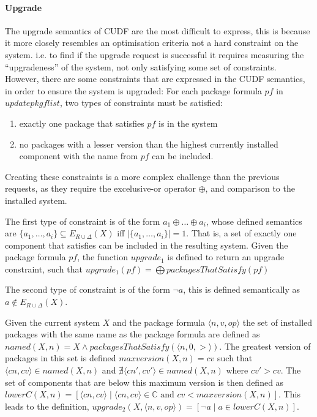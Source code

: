 \paragraph{Upgrade}
The upgrade semantics of CUDF are the most difficult to express, this is because it more closely resembles an optimisation criteria not a hard constraint on the system.
i.e. to find if the upgrade request is successful it requires measuring the ``upgradeness'' of the system, not only satisfying some set of constraints.
However, there are some constraints that are expressed in the CUDF semantics, in order to ensure the system is upgraded:
For each package formula $pf$ in $updatepkgflist$, two types of constraints must be satisfied:
\begin{enumerate}
  \item exactly one package that satisfies $pf$ is in the system
  \item no packages with a lesser version than the highest currently installed component with the name from $pf$ can be included.
\end{enumerate} 

Creating these constraints is a more complex challenge than the previous requests, as they require the excelusive-or operator $\oplus$, and comparison to the installed system. 

The first type of constraint is of the form $a_1 \oplus \ldots \oplus a_i$, 
whose defined semantics are $\{a_1,\ldots,a_i\} \subseteq E_{R \cup \Delta}(X)$ iff $|\{a_1,\ldots,a_i\}| = 1$.
That is, a set of exactly one component that satisfies can be included in the resulting system.
Given the package formula $pf$, the function $upgrade_1$ is defined to return an upgrade constraint,
such that $upgrade_1(pf) = \bigoplus packagesThatSatisfy(pf)$

The second type of constraint is of the form $\neg a$,
this is defined semantically as $a \not \in E_{R \cup \Delta}(X)$.

Given the current system $X$ and the package formula $\langle n,v,op \rangle$ the set of installed packages with the same name as the package formula are defined as 
$named(X,n) = X \wedge packagesThatSatisfy(\langle n,0,> \rangle)$.
The greatest version of packages in this set is defined 
$maxversion(X,n) = cv$  such that $\langle cn,cv \rangle \in named(X,n)$ and $\nexists \langle cn',cv' \rangle \in named(X,n)$ where $cv' > cv$.
The set of components that are below this maximum version is then defined as
$lowerC(X,n) = [\langle cn,cv \rangle \mid \langle cn,cv \rangle \in \mathbb{C} \mbox{ and } cv < maxversion(X,n)]$.
This leads to the definition, $upgrade_2(X,\langle n,v,op \rangle) = [\neg a \mid a \in lowerC(X,n)]$.

